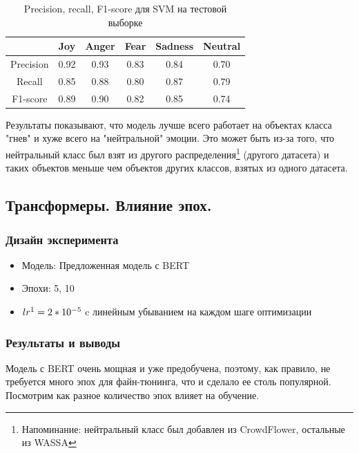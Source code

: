 \documentclass{article}
\begin{document}
\begin{table}[h!]
    \centering
    \begin{tabular}{|c|c|c|c|c|c|}
        \hline
            & Joy & Anger & Fear & Sadness & Neutral \\
        \hline
            Precision & 0.92 &  0.93 & 0.83 & 0.84 & 0.70\\
        \hline
            Recall  &  0.85 & 0.88 & 0.80 & 0.87 & 0.79\\
        \hline
            F1-score & 0.89 &  0.90 & 0.82 & 0.85 & 0.74\\
        \hline
    \end{tabular}
    \caption{Precision, recall, F1-score для SVM на тестовой выборке}
    \label{table:table4}
\end{table}

Результаты показывают, что модель лучше всего работает на объектах класса "гнев"{} и хуже всего на "нейтральной"{} эмоции. Это может быть из-за того, что нейтральный класс был взят из другого распределения\footnote{Напоминание: нейтральный класс был добавлен из CrowdFlower, остальные из WASSA} (другого датасета) и таких объектов меньше чем объектов других классов, взятых из одного датасета.

\subsection{Трансформеры. Влияние эпох.}
\subsubsection{Дизайн эксперимента}
\begin{itemize}
    \item Модель: Предложенная модель с BERT
    \item Эпохи: 5, 10
    \item $lr\footnotemark = 2*10^{-5}$ c линейным убыванием на каждом шаге оптимизации
\end{itemize}

\subsubsection{Результаты и выводы}
Модель с BERT очень мощная и уже предобучена, поэтому, как правило, не требуется много эпох для файн-тюнинга, что и сделало ее столь популярной. Посмотрим как разное количество эпох влияет на обучение.
\end{document}
